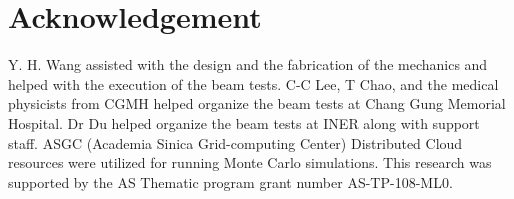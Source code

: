 \documentclass[11pt,a4paper]{article}
\begin{document}
\section*{Acknowledgement}
Y. H. Wang assisted with the design and the fabrication of the mechanics and helped with the execution of the beam tests. C-C Lee, T Chao, and the medical physicists from CGMH helped organize the beam tests at Chang Gung Memorial Hospital. Dr Du helped organize the beam tests at INER along with support staff. ASGC (Academia Sinica Grid-computing Center) Distributed Cloud resources were utilized for running Monte Carlo simulations. This research was supported by the AS Thematic program grant number AS-TP-108-ML0.




\end{document}
